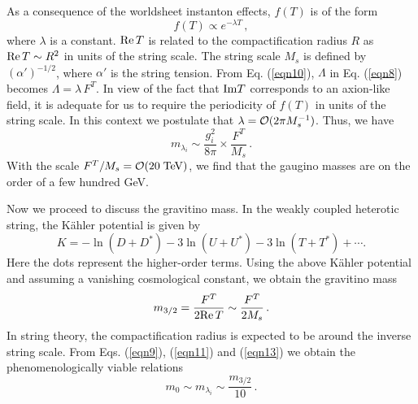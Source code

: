 As a consequence of the worldsheet instanton effects, 
$f(T)$ is of the form 
\begin{equation}
    f(T) \propto e^{-\lambda T}\,, 
\label{eqn10}
\end{equation}
where $\lambda$ is a constant. 
${\rm Re}\,T$ is related to the compactification radius 
$R$ as ${\rm Re}\,T \sim R^{2}$ in units of the string scale. 
The string scale $M_s$ is defined by $(\alpha ')^{-1/2}$, 
where $\alpha '$ is the string tension.  
From Eq. (\ref{eqn10}), $\Lambda$ in Eq. (\ref{eqn8}) becomes 
$\Lambda = \lambda \,F^{T}$. 
In view of the fact that ${\rm Im}T$ corresponds to an axion-like 
field, 
it is adequate for us to require the periodicity of $f(T)$ 
in units of the string scale. 
In this context we postulate that 
$\lambda = {\cal O}(2 \pi M_s^{-1})$. 
Thus, we have 
\begin{equation}
    m_{\lambda _i} \sim \frac {g_i^2}{8\pi} 
                        \times \frac {F^T}{M_s}\,. 
\label{eqn11}
\end{equation}
With the scale $F^T/M_s = {\cal O}(20\;{\rm TeV})$, 
we find that the gaugino masses are on the order of a few hundred GeV. 

Now we proceed to discuss the gravitino mass. 
In the weakly coupled heterotic string, the K\"ahler potential 
is given by \cite{kahler}
\begin{equation}
    K = - \ln (D+D^{\ast}) - 3\ln (U+U^{\ast})
                           - 3\ln (T+T^{\ast}) + \cdots . 
\label{eqn12}
\end{equation}
Here the dots represent the higher-order terms. 
Using the above K\"ahler potential and assuming 
a vanishing cosmological constant,
we obtain the gravitino mass
\begin{equation}
     m_{3/2} = \frac{F^{T}}{2{\rm Re}\,T}\sim \frac{F^{T}}{2M_s}\,.
\label{eqn13}
\end{equation}
In string theory, the compactification radius is expected to be 
around the inverse string scale. 
From Eqs. (\ref{eqn9}), (\ref{eqn11}) and (\ref{eqn13}) we obtain 
the phenomenologically viable relations 
\begin{equation}
     m_{0} \sim m_{\lambda_i} \sim \frac {m_{3/2}}{10}\,. 
\label{eqn14}
\end{equation}

